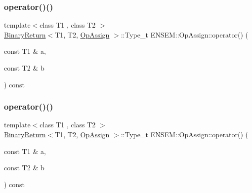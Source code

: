 \subsubsection{\texorpdfstring{operator()()}{operator()()}\hspace{0.1cm}{\footnotesize\ttfamily [1/3]}}
{\footnotesize\ttfamily template$<$class T1 , class T2 $>$ \\
\mbox{\hyperlink{structENSEM_1_1BinaryReturn}{Binary\+Return}}$<$T1, T2, \mbox{\hyperlink{structENSEM_1_1OpAssign}{Op\+Assign}} $>$\+::Type\+\_\+t E\+N\+S\+E\+M\+::\+Op\+Assign\+::operator() (\begin{DoxyParamCaption}\item[{const T1 \&}]{a,  }\item[{const T2 \&}]{b }\end{DoxyParamCaption}) const\hspace{0.3cm}{\ttfamily [inline]}}

\mbox{\label{structENSEM_1_1OpAssign_aaab39b3bd0c80dac6b56a48970ff388a}} 
\subsubsection{\texorpdfstring{operator()()}{operator()()}\hspace{0.1cm}{\footnotesize\ttfamily [2/3]}}
{\footnotesize\ttfamily template$<$class T1 , class T2 $>$ \\
\mbox{\hyperlink{structENSEM_1_1BinaryReturn}{Binary\+Return}}$<$T1, T2, \mbox{\hyperlink{structENSEM_1_1OpAssign}{Op\+Assign}} $>$\+::Type\+\_\+t E\+N\+S\+E\+M\+::\+Op\+Assign\+::operator() (\begin{DoxyParamCaption}\item[{const T1 \&}]{a,  }\item[{const T2 \&}]{b }\end{DoxyParamCaption}) const\hspace{0.3cm}{\ttfamily [inline]}}

\mbox{\label{structENSEM_1_1OpAssign_aaab39b3bd0c80dac6b56a48970ff388a}} 
